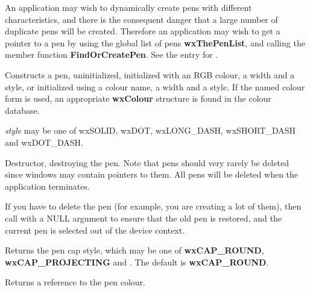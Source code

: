 An application may wish to dynamically create pens with different
characteristics, and there is the consequent danger that a large number
of duplicate pens will be created. Therefore an application may wish to
get a pointer to a pen by using the global list of pens {\bf
wxThePenList}, and calling the member function {\bf FindOrCreatePen}.
See the entry for .

\label{wxpen}




Constructs a pen, uninitialized, initialized with an RGB colour, a
width and a style, or initialized using a colour name, a width and a
style.  If the named colour form is used, an appropriate {\bf
wxColour} structure is found in the colour database.

{\it style} may be one of wxSOLID, wxDOT, wxLONG\_DASH, wxSHORT\_DASH and
wxDOT\_DASH.



Destructor, destroying the pen. Note that pens should very rarely be deleted
since windows may contain pointers to them. All pens will be deleted when the
application terminates.

If you have to delete the pen (for example, you are creating a lot of
them), then call  with a NULL argument
to ensure that the old pen is restored, and the current pen is selected
out of the device context.



Returns the pen cap style, which may be one of {\bf wxCAP\_ROUND}, {\bf wxCAP\_PROJECTING} and
. The default is {\bf wxCAP\_ROUND}.



Returns a reference to the pen colour.



